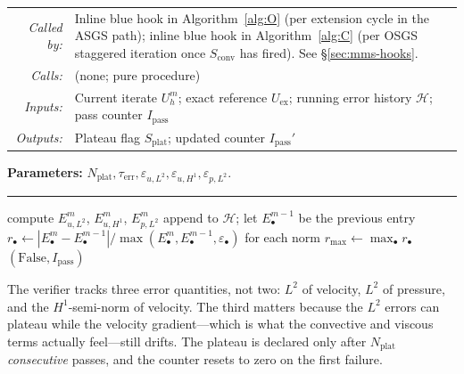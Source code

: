 \documentclass{article}
\newcommand{\extline}[1]{{\color{extcolor}#1}}
\begin{document}
\begin{tcolorbox}[colback=extcolor!5!white, colframe=extcolor, boxrule=0.4pt, arc=2pt, left=8pt, right=8pt, top=4pt, bottom=4pt, width=\textwidth, before skip=4pt, after skip=2pt]
\footnotesize
\extline{%
\begin{tabular}{@{}r@{\quad}p{}@{}}
\textit{Called by:} & Inline blue hook in Algorithm~\ref{alg:O} (per extension cycle in the ASGS path); inline blue hook in Algorithm~\ref{alg:C} (per OSGS staggered iteration once $S_{\mathrm{conv}}$ has fired). See §\ref{sec:mms-hooks}. \\
\textit{Calls:}     & (none; pure procedure) \\
\textit{Inputs:}    & Current iterate $U_h^m$; exact reference $U_{\mathrm{ex}}$; running error history $\mathcal{H}$; pass counter $I_{\mathrm{pass}}$ \\
\textit{Outputs:}   & Plateau flag $S_{\mathrm{plat}}$; updated counter $I_{\mathrm{pass}}'$ \\
\end{tabular}}
\end{tcolorbox}

\begin{algorithm}[H]
\caption{\extline{$\mathrm{VerifyMMSPlateau}$: relative-change plateau test (optional extension).}}
\label{alg:D}
\SetAlgoLined
\textcolor{extcolor}{\textbf{Parameters:} $N_{\mathrm{plat}}, \tau_{\mathrm{err}}, \varepsilon_{u,L^2}, \varepsilon_{u,H^1}, \varepsilon_{p,L^2}$.\\
\vspace{0.2cm}\hrule\vspace{0.2cm}
compute $E_{u,L^2}^m$, $E_{u,H^1}^m$, $E_{p,L^2}^m$\;
append to $\mathcal{H}$; let $E^{m-1}_\bullet$ be the previous entry\;
$r_\bullet \gets |E_\bullet^m - E_\bullet^{m-1}| / \max(E_\bullet^m, E_\bullet^{m-1}, \varepsilon_\bullet)$ for each norm\;
$r_{\max} \gets \max_\bullet r_\bullet$\;
\Return $(\mathrm{False}, I_{\mathrm{pass}})$ }
\end{algorithm}

\extline{The verifier tracks three error quantities, not two: $L^2$
of velocity, $L^2$ of pressure, and the $H^1$-semi-norm of velocity.
The third matters because the $L^2$ errors can plateau while the
velocity gradient---which is what the convective and viscous terms
actually feel---still drifts. The plateau is declared only after
$N_{\mathrm{plat}}$ \emph{consecutive} passes, and the counter resets
to zero on the first failure.}
\end{document}

